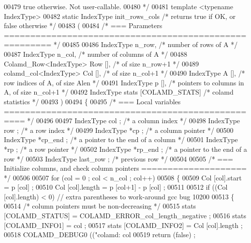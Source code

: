 \begin{DoxyCode}
{{{{{{{00479 \textcolor{comment}{  true otherwise.  Not user-callable.}
00480 \textcolor{comment}{*/}
00481 \textcolor{keyword}{template} <\textcolor{keyword}{typename} IndexType>
00482 \textcolor{keyword}{static} IndexType init\_rows\_cols  \textcolor{comment}{/* returns true if OK, or false otherwise */}
00483   (
00484     \textcolor{comment}{/* === Parameters ======================================================= */}
00485 
00486     IndexType n\_row,      \textcolor{comment}{/* number of rows of A */}
00487     IndexType n\_col,      \textcolor{comment}{/* number of columns of A */}
00488     Colamd\_Row<IndexType> Row [],    \textcolor{comment}{/* of size n\_row+1 */}
00489     colamd\_col<IndexType> Col [],    \textcolor{comment}{/* of size n\_col+1 */}
00490     IndexType A [],     \textcolor{comment}{/* row indices of A, of size Alen */}
00491     IndexType p [],     \textcolor{comment}{/* pointers to columns in A, of size n\_col+1 */}
00492     IndexType stats [COLAMD\_STATS]  \textcolor{comment}{/* colamd statistics */} 
00493     )
00494 \{
00495   \textcolor{comment}{/* === Local variables ================================================== */}
00496 
00497   IndexType col ;     \textcolor{comment}{/* a column index */}
00498   IndexType row ;     \textcolor{comment}{/* a row index */}
00499   IndexType *cp ;     \textcolor{comment}{/* a column pointer */}
00500   IndexType *cp\_end ;   \textcolor{comment}{/* a pointer to the end of a column */}
00501   IndexType *rp ;     \textcolor{comment}{/* a row pointer */}
00502   IndexType *rp\_end ;   \textcolor{comment}{/* a pointer to the end of a row */}
00503   IndexType last\_row ;    \textcolor{comment}{/* previous row */}
00504 
00505   \textcolor{comment}{/* === Initialize columns, and check column pointers ==================== */}
00506 
00507   \textcolor{keywordflow}{for} (col = 0 ; col < n\_col ; col++)
00508   \{
00509     Col [col].start = p [col] ;
00510     Col [col].length = p [col+1] - p [col] ;
00511 
00512     \textcolor{keywordflow}{if} ((Col [col].length) < 0) \textcolor{comment}{// extra parentheses to work-around gcc bug 10200}
00513     \{
00514       \textcolor{comment}{/* column pointers must be non-decreasing */}
00515       stats [COLAMD\_STATUS] = COLAMD\_ERROR\_col\_length\_negative ;
00516       stats [COLAMD\_INFO1] = col ;
00517       stats [COLAMD\_INFO2] = Col [col].length ;
00518       COLAMD\_DEBUG0 ((\textcolor{stringliteral}{"colamd: col %
00519       \textcolor{keywordflow}{return} (\textcolor{keyword}{false}) ;
}}}}}}}}
\end{DoxyCode}
